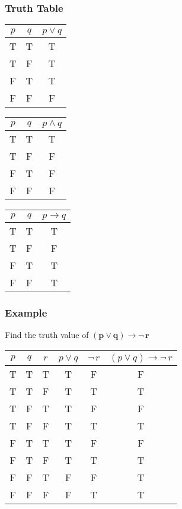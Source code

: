 \documentclass[11pt]{article}
\begin{document}
\subsubsection*{Truth Table}
\begin{table}[H]
    \centering
    \hfill
    \begin{minipage}{.32\textwidth}
        \centering
        \begin{tabular}{c|c|c}
            $p$ & $q$ & $p \lor q$\\
            \hline
            T & T & T\\
            T & F & T\\
            F & T & T\\
            F & F & F
        \end{tabular}
    \end{minipage}
    \hfill
    \begin{minipage}{.32\textwidth}
        \centering
        \begin{tabular}{c|c|c}
            $p$ & $q$ & $p \land q$\\
            \hline
            T & T & T\\
            T & F & F\\
            F & T & F\\
            F & F & F
        \end{tabular}
    \end{minipage}
    \hfill
    \begin{minipage}{.32\textwidth}
        \centering
        \begin{tabular}{c|c|c}
            $p$ & $q$ & $p \rightarrow q$\\
            \hline
            T & T & T\\
            T & F & F\\
            F & T & T\\
            F & F & T
        \end{tabular}
    \end{minipage}
    \hfill
\end{table}
\subsubsection*{Example}
Find the truth value of $\boldsymbol{(p \lor q)\rightarrow \lnot \,r}$
\begin{table}[H]
    \centering
    \begin{tabular}{c|c|c|c|c|c}
        $p$ & $q$ & $r$ & $p \lor q$ & $\lnot \,r$& $(p \lor q)\rightarrow \lnot\, r$ \\
        \hline
        T & T & T & T & F & F\\
        T & T & F & T & T & T\\
        T & F & T & T & F & F\\
        T & F & F & T & T & T\\
        F & T & T & T & F & F\\
        F & T & F & T & T & T\\
        F & F & T & F & F & T\\
        F & F & F & F & T & T
    \end{tabular}
\end{table}
\end{document}
